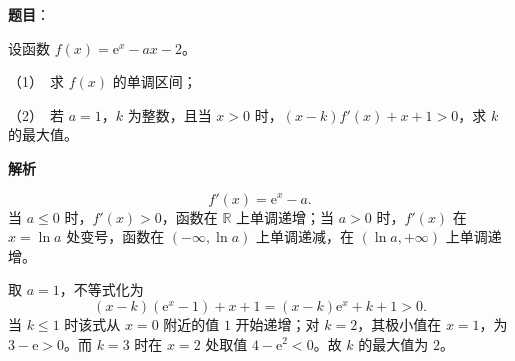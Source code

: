 \begin{answer}

\textbf{题目}：

设函数 $f(x)=\mathrm e^x-ax-2$。

（1）　求 $f(x)$ 的单调区间；

（2）　若 $a=1$，$k$ 为整数，且当 $x>0$ 时，$(x-k)f'(x)+x+1>0$，求 $k$ 的最大值。

\textbf{解析}


\nopagebreak[4]
\[
f'(x)=\mathrm e^x-a.
\]
当 $a\leqslant0$ 时，$f'(x)>0$，函数在 $\mathbb R$ 上单调递增；当 $a>0$ 时，$f'(x)$ 在 $x=\ln a$ 处变号，函数在 $(-\infty,\ln a)$ 上单调递减，在 $(\ln a,+\infty)$ 上单调递增。


取 $a=1$，不等式化为
\nopagebreak[4]
\[
(x-k)(\mathrm e^x-1)+x+1=(x-k)\mathrm e^x+k+1>0.
\]
当 $k\leqslant1$ 时该式从 $x=0$ 附近的值 $1$ 开始递增；对 $k=2$，其极小值在 $x=1$，为 $3-\mathrm e>0$。而 $k=3$ 时在 $x=2$ 处取值 $4-\mathrm e^2<0$。故 $k$ 的最大值为 $2$。



\end{answer}
